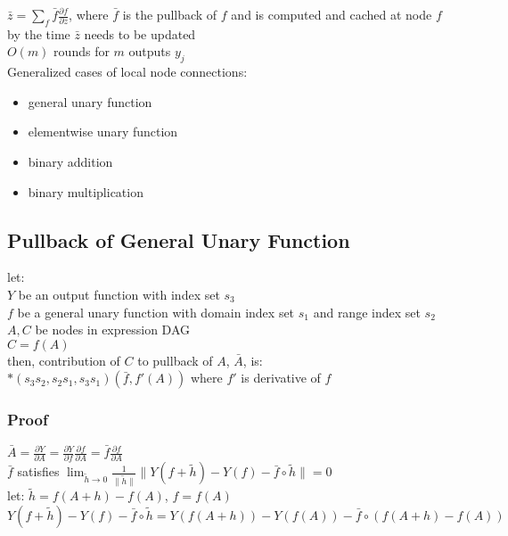 \documentclass[8pt]{extarticle}
\begin{document}
\begin{multicols*}{2}
  $\bar{z} = \sum_f \bar{f} \frac{\partial f}{\partial z}$, where $\bar{f}$ is the pullback of $f$ and is computed and cached at node $f$ by the time $\bar{z}$ needs to be updated\\
  
  $O(m)$ rounds for $m$ outputs $y_j$\\

  Generalized cases of local node connections:
  \begin{itemize}
  \item general unary function
  \item elementwise unary function
  \item binary addition
  \item binary multiplication
  \end{itemize}

  \vfill\null
  \columnbreak
    
  \subsection{Pullback of General Unary Function}
  let:\\
  $Y$ be an output function with index set $s_3$\\
  $f$ be a general unary function with domain index set $s_1$ and range index set $s_2$\\
  $A, C$ be nodes in expression DAG\\
  $C=f(A)$\\
  then, contribution of $C$ to pullback of $A$, $\bar{A}$, is:\\
  $*(s_3 s_2, s_2 s_1, s_3 s_1)(\bar{f}, f'(A))$ where $f'$ is derivative of $f$\\

  \subsubsection{Proof}
  $\bar{A} = \frac{\partial Y}{\partial A} = \frac{\partial Y}{\partial f} \frac{\partial f}{\partial A} = \bar{f} \frac{\partial f}{\partial A}$\\

  $\bar{f}$ satisfies $\lim_{\tilde{h} \rightarrow 0} \frac{1}{\| \tilde{h} \|} \|Y(f+\tilde{h}) - Y(f) - \bar{f} \circ \tilde{h} \| = 0$\\

  let:
  $\tilde{h} = f(A+h) - f(A)$, $f=f(A)$\\
  $Y(f+\tilde{h}) - Y(f) - \bar{f} \circ \tilde{h} = Y(f(A+h)) - Y(f(A)) - \bar{f} \circ (f(A+h) - f(A))$\\


\end{multicols*}
\end{document}
